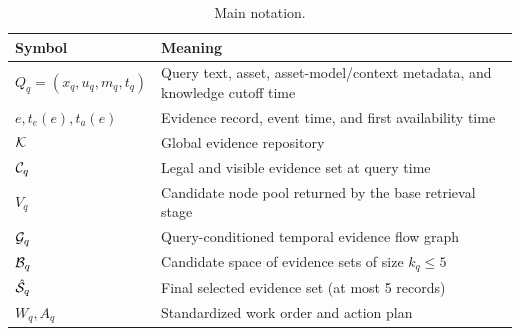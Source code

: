 \begin{table}[t]
\caption{Main notation.}
\label{tab:symbols}
\centering
\small
\begin{tabular}{@{}p{}p{}@{}}
\toprule
Symbol & Meaning \\
\midrule
$Q_q=(x_q,u_q,m_q,t_q)$ & Query text, asset, asset-model/context metadata, and knowledge cutoff time \\
$e,t_e(e),t_a(e)$ & Evidence record, event time, and first availability time \\
$\mathcal{K}$ & Global evidence repository \\
$\mathcal{C}_q$ & Legal and visible evidence set at query time \\
$V_q$ & Candidate node pool returned by the base retrieval stage \\
$\mathcal{G}_q$ & Query-conditioned temporal evidence flow graph \\
$\mathcal{B}_q$ & Candidate space of evidence sets of size $k_q\leq 5$ \\
$\hat{\mathcal{S}}_q$ & Final selected evidence set (at most 5 records) \\
$W_q,A_q$ & Standardized work order and action plan \\
\bottomrule
\end{tabular}
\end{table}
